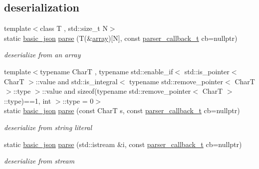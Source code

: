 \subsection*{deserialization}
\begin{DoxyCompactItemize}
\item 
{\footnotesize template$<$class T , std\+::size\+\_\+t N$>$ }\\static \hyperlink{classnlohmann_1_1basic__json}{basic\+\_\+json} \hyperlink{classnlohmann_1_1basic__json_ace63ac4eb1dd7251a259d32e397461a3}{parse} (T(\&\hyperlink{classnlohmann_1_1basic__json_a5685815624b086caa532f41e853d4b0f}{array})\mbox{[}N\mbox{]}, const \hyperlink{classnlohmann_1_1basic__json_a9e35475e2027520a78e09f460dbe048a}{parser\+\_\+callback\+\_\+t} cb=nullptr)
\begin{DoxyCompactList}\small\item\em deserialize from an array \end{DoxyCompactList}\item 
{\footnotesize template$<$typename Char\+T , typename std\+::enable\+\_\+if$<$                                                              std\+::is\+\_\+pointer$<$ Char\+T $>$\+::value and                                                           std\+::is\+\_\+integral$<$ typename std\+::remove\+\_\+pointer$<$ Char\+T $>$\+::type $>$\+::value and                                                           sizeof(typename std\+::remove\+\_\+pointer$<$ Char\+T $>$\+::type)==1, int $>$\+::type  = 0$>$ }\\static \hyperlink{classnlohmann_1_1basic__json}{basic\+\_\+json} \hyperlink{classnlohmann_1_1basic__json_a628a37ce21fc6e6e2009dca2609d62c2}{parse} (const Char\+T s, const \hyperlink{classnlohmann_1_1basic__json_a9e35475e2027520a78e09f460dbe048a}{parser\+\_\+callback\+\_\+t} cb=nullptr)
\begin{DoxyCompactList}\small\item\em deserialize from string literal \end{DoxyCompactList}\item 
static \hyperlink{classnlohmann_1_1basic__json}{basic\+\_\+json} \hyperlink{classnlohmann_1_1basic__json_a0923f9749409345a21f8cb15ee95fc0d}{parse} (std\+::istream \&i, const \hyperlink{classnlohmann_1_1basic__json_a9e35475e2027520a78e09f460dbe048a}{parser\+\_\+callback\+\_\+t} cb=nullptr)
\begin{DoxyCompactList}\small\item\em deserialize from stream \end{DoxyCompactList}\item 

\end{DoxyCompactItemize}
